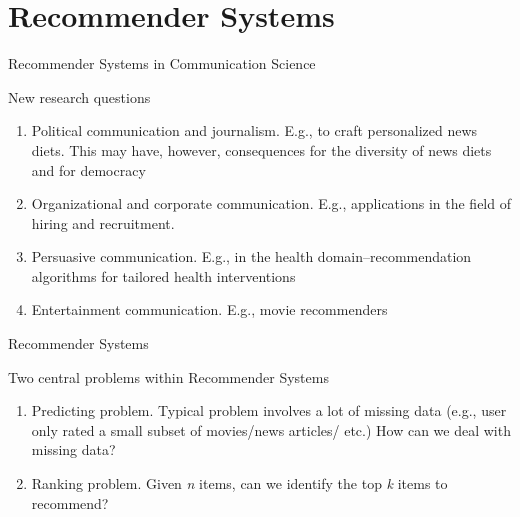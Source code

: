 \section{Recommender Systems}

\begin{frame}
\end{frame}

\begin{frame}{Recommender Systems in Communication Science}  
	\begin{block}{New research questions}
		\begin{enumerate}
			\item<2-> \alert{Political communication and journalism}. E.g., to craft personalized news diets. This may have, however, consequences for the diversity of news diets and for democracy \parencite{Moller2018, Locherbach2018}
			\item<3-> \alert{Organizational and corporate communication}. E.g., applications in the field of hiring and recruitment.
			\item<4-> \alert{Persuasive communication}. E.g., in the health domain--recommendation algorithms for tailored health interventions \parencite{Kim2019}
			\item<5-> \alert{Entertainment communication}. E.g., movie recommenders
				\end{enumerate}
	\end{block}
\end{frame}

\begin{frame}{Recommender Systems} 
\begin{block}{Two central problems within Recommender Systems}
	\begin{enumerate}
		\item<2-> \alert{Predicting problem}. Typical problem involves a lot of missing data (e.g., user only rated a small subset of movies/news articles/ etc.) How can we deal with missing data? 
		\item<3-> \alert{Ranking problem}.  Given \textit{n} items, can we identify the top \textit{k} items to recommend?
	\end{enumerate}
\end{block}
\end{frame}

